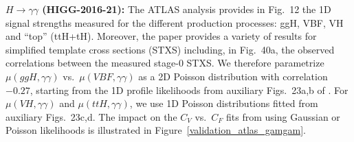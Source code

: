 {\bf\boldmath $H\to\gamma\gamma$ (HIGG-2016-21):}  The ATLAS analysis \cite{Aaboud:2018xdt} provides in Fig.~12 the 1D signal strengths measured for the different production processes:  
ggH, VBF, VH and ``top'' (ttH+tH). Moreover, the paper provides a variety of results for simplified template cross sections (STXS) 
including, in Fig.~40a, the observed correlations between the measured stage-0 STXS. 
%
We therefore parametrize $\mu(ggH,\gamma\gamma)$ vs.\ $\mu(VBF,\gamma\gamma)$ as a 2D Poisson distribution with correlation $-0.27$,  starting from the 1D profile likelihoods from auxiliary Figs.~23a,b of \cite{Aaboud:2018xdt}. For $\mu(VH,\gamma\gamma)$ and $\mu(ttH,\gamma\gamma)$, we use 1D Poisson distributions fitted from auxiliary Figs.~23c,d. 
The impact on the $C_V$ vs.\ $C_F$ fits from using Gaussian or Poisson likelihoods is illustrated 
in Figure~\ref{validation_atlas_gamgam}. \\

 
